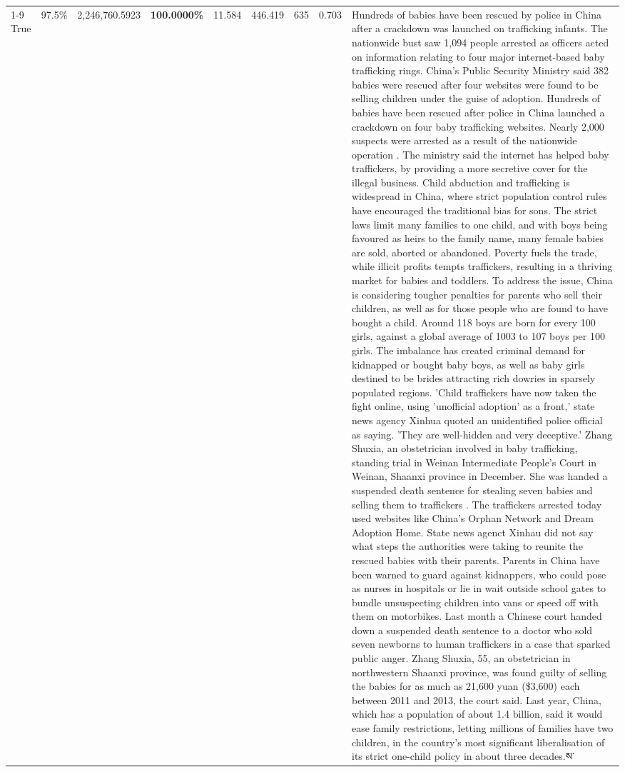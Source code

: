\begin{table}[H]
\begin{tabular}{lllrlllll}
\cline{1-9}
True & 97.5\% & 2,246,760.5923 & \bfseries \color{red} 100.0000\% & 11.584 & 446.419 & 635 & 0.703 & Hundreds of babies have been rescued by police in China after a crackdown was launched on trafficking infants. The nationwide bust saw 1,094 people arrested as officers acted on information relating to four major internet-based baby trafficking rings. China's Public Security Ministry said 382 babies were rescued after four websites were found to be selling children under the guise of adoption. Hundreds of babies have been rescued after police in China launched a crackdown on four baby trafficking websites. Nearly 2,000 suspects were arrested as a result of the nationwide operation . The ministry said the internet has helped baby traffickers, by providing a more secretive cover for the illegal business. Child abduction and trafficking is widespread in China, where strict population control rules have encouraged the traditional bias for sons. The strict laws limit many families to one child, and with boys being favoured as heirs to the family name, many female babies are sold, aborted or abandoned. Poverty fuels the trade, while illicit profits tempts traffickers, resulting in a thriving market for babies and toddlers. To address the issue, China is considering tougher penalties for parents who sell their children, as well as for those people who are found to have bought a child. Around 118 boys are born for every 100 girls, against a global average of 1003 to 107 boys per 100 girls. The imbalance has created criminal demand for kidnapped or bought baby boys, as well as baby girls destined to be brides attracting rich dowries in sparsely populated regions. 'Child traffickers have now taken the fight online, using 'unofficial adoption' as a front,' state news agency Xinhua quoted an unidentified police official as saying. 'They are well-hidden and very deceptive.' Zhang Shuxia, an obstetrician involved in baby trafficking, standing trial in Weinan Intermediate People's Court in Weinan, Shaanxi province in December. She was handed a suspended death sentence for stealing seven babies and selling them to traffickers . The traffickers arrested today used websites like China's Orphan Network and Dream Adoption Home. State news agenct Xinhau did not say what steps the authorities were taking to reunite the rescued babies with their parents. Parents in China have been warned to guard against kidnappers, who could pose as nurses in hospitals or lie in wait outside school gates to bundle unsuspecting children into vans or speed off with them on motorbikes. Last month a Chinese court handed down a suspended death sentence to a doctor who sold seven newborns to human traffickers in a case that sparked public anger. Zhang Shuxia, 55, an obstetrician in northwestern Shaanxi province, was found guilty of selling the babies for as much as 21,600 yuan (\$3,600) each between 2011 and 2013, the court said. Last year, China, which has a population of about 1.4 billion, said it would ease family restrictions, letting millions of families have two children, in the country's most significant liberalisation of its strict one-child policy in about three decades.ས་ \\

\end{tabular}
\end{table}
